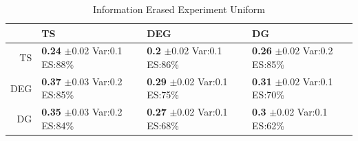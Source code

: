 \documentclass[11pt,letterpaper]{article}
\begin{document}
\begin{table}[H]
\centering
\caption{Information Erased Experiment Uniform} 
\begin{tabular}{rlll}
  \hline
 & TS & DEG &  DG \\ 
  \hline
TS & \makecell{\textbf{0.24} $\pm$0.02\\Var:0.1\\ES:88\%} & \makecell{\textbf{0.2} $\pm$0.02\\Var:0.1\\ES:86\%} & \makecell{\textbf{0.26} $\pm$0.02\\Var:0.2\\ES:85\%} \\ 
  DEG & \makecell{\textbf{0.37} $\pm$0.03\\Var:0.2\\ES:85\%} & \makecell{\textbf{0.29} $\pm$0.02\\Var:0.1\\ES:75\%} & \makecell{\textbf{0.31} $\pm$0.02\\Var:0.1\\ES:70\%} \\ 
   DG & \makecell{\textbf{0.35} $\pm$0.03\\Var:0.2\\ES:84\%} & \makecell{\textbf{0.27} $\pm$0.02\\Var:0.1\\ES:68\%} & \makecell{\textbf{0.3} $\pm$0.02\\Var:0.1\\ES:62\%} \\ 
   \hline
\end{tabular}
\end{table}
\end{document}

